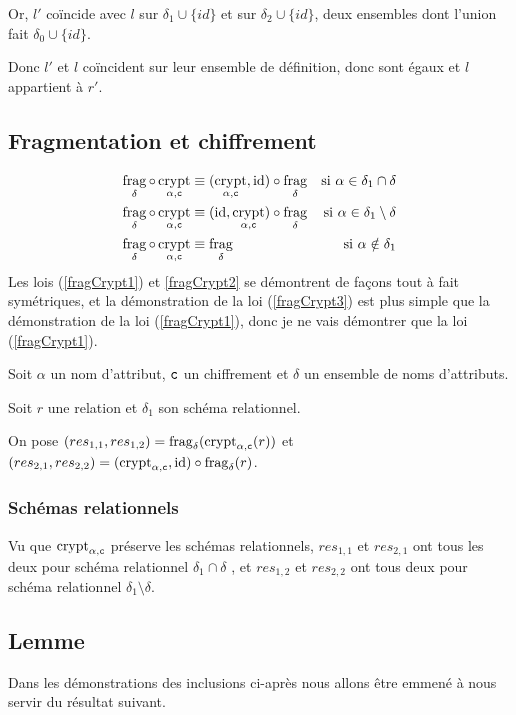 \documentclass[french]{article}
\DeclareMathOperator{\frag}{frag}
\DeclareMathOperator{\crypt}{crypt}
\DeclareMathOperator{\id}{id}
\newcommand\typeT[1]{\text{\ttfamily #1}}
\newcommand{\cryptArgs}[2]{\crypt_{#1 , \typeT{#2}}}
\newcommand{\cryptCAlpha}{\cryptArgs{\alpha}{c}}
\newcommand{\fragDelta}{\frag_{\delta}}
\newcommand{\cip}{\cup \{id\}}
\begin{document}
Or, $l'$ coïncide avec $l$ sur
$\delta_1 \cip$ et sur $\delta_2 \cip$, 
deux ensembles dont l'union fait $\delta_0 \cip$.

Donc $l'$ et $l$ coïncident sur leur ensemble de définition,
donc sont égaux et $l$ appartient à $r'$.

\subsection*{Fragmentation et chiffrement}
\begin{align}
\fragDelta \circ \cryptCAlpha
& \equiv (\cryptCAlpha, \id) \circ\fragDelta 
& \text{si $\alpha \in \delta_1 \cap \delta$}
\label{fragCrypt1} \\
\fragDelta \circ \cryptCAlpha
& \equiv (\id, \cryptCAlpha) \circ\fragDelta 
& \text{si $\alpha \in \delta_1 \setminus \delta$}
\label{fragCrypt2} \\
\fragDelta \circ \cryptCAlpha
& \equiv \fragDelta
& \text{si $\alpha \notin \delta_1$}
\label{fragCrypt3}
\end{align}
Les lois (\ref{fragCrypt1}) et \ref{fragCrypt2} se démontrent 
de façons tout à fait symétriques,
et la démonstration de la loi (\ref{fragCrypt3})
est plus simple que la démonstration de la loi (\ref{fragCrypt1}),
donc je ne vais démontrer que la loi (\ref{fragCrypt1}).



Soit $\alpha$ un nom d'attribut,
$\typeT{c}$ un chiffrement
et $\delta$ un ensemble
de noms d'attributs.

Soit $r$ une relation et $\delta_1$
son schéma relationnel.

On pose
$(res_{1,1}, res_{1,2}) = \fragDelta(\cryptCAlpha(r))$
et $(res_{2,1}, res_{2,2}) = (\cryptCAlpha, \id) \circ \fragDelta(r)$.

\subsubsection*{Schémas relationnels}
Vu que $\cryptCAlpha$ préserve les schémas relationnels,
$res_{1,1}$ et $res_{2,1}$ ont tous les deux pour schéma relationnel
$\delta_1 \cap \delta$ , et
$res_{1,2}$ et $res_{2,2}$ ont tous deux pour schéma relationnel
$\delta_1 \setminus \delta$.

\subsection*{Lemme}
Dans les démonstrations des inclusions ci-après
nous allons être emmené à nous servir du résultat
suivant.
\end{document}
